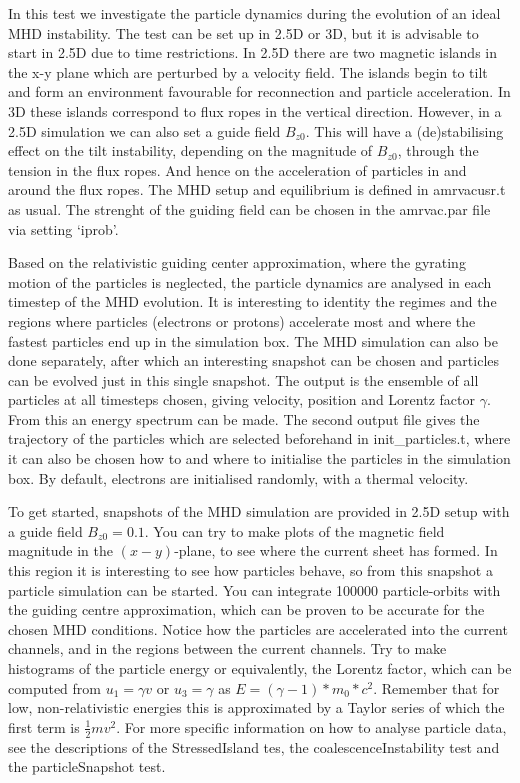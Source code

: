 \documentclass[10pt]{article}
\begin{document}
In this test we investigate the particle dynamics during the evolution of an ideal MHD instability. The test can be set up in 2.5D or 3D, but it is advisable to start in 2.5D due to time restrictions. In 2.5D there are two magnetic islands in the x-y plane which are perturbed by
a velocity field. The islands begin to tilt and form an environment favourable for reconnection and particle acceleration. In 3D these islands correspond to flux ropes in the vertical direction. However, in a 2.5D simulation we can also set a guide field $B_{z0}$.
This will have a (de)stabilising effect on the tilt instability, depending on the magnitude of $B_{z0}$, through the tension in the flux ropes. And hence on the acceleration of particles in and around the flux ropes. The MHD
setup and equilibrium is defined in amrvacusr.t as usual. The strenght of the guiding field can be chosen in the amrvac.par file via setting `iprob'.

Based on the relativistic guiding center approximation, where the gyrating motion of the particles is neglected, the particle dynamics are analysed in each timestep of the MHD evolution. It is interesting to identity the regimes and the regions where particles (electrons or protons) accelerate most and where the
fastest particles end up in the simulation box. The MHD simulation can also be done separately, after which an interesting snapshot can be chosen and particles can be evolved just in this single snapshot. The output is the ensemble of all particles at all timesteps
chosen, giving velocity, position and Lorentz factor $\gamma$. From this an energy spectrum can be made. The second output file gives the trajectory of the particles
which are selected beforehand in init\_particles.t, where it can also be chosen how to and where to initialise the particles in the simulation box. By default, electrons are initialised randomly, with a thermal velocity.

To get started, snapshots of the MHD simulation are provided in 2.5D setup with a guide field $B_{z0}=0.1$. You can try to make plots of the magnetic field magnitude in the $(x-y)$-plane, to see where the current sheet has formed. In this region it is interesting to see how
particles behave, so from this snapshot a particle simulation can be started. You can integrate 100000 particle-orbits with the guiding centre approximation, which can be proven to be accurate for the chosen MHD conditions. Notice how the particles are accelerated into
the current channels, and in the regions between the current channels. Try to make histograms of the particle energy or equivalently, the Lorentz factor, which can be computed from $u_1 = \gamma v$ or $u_3 = \gamma$ as $E = (\gamma-1)*m_0 *c^2$. Remember that for low, non-relativistic
energies this is approximated by a Taylor series of which the first term is $\frac{1}{2} m v^2$. For more specific information on how to analyse particle data, see the descriptions of the StressedIsland tes, the coalescenceInstability test and the particleSnapshot
test.
\end{document}
